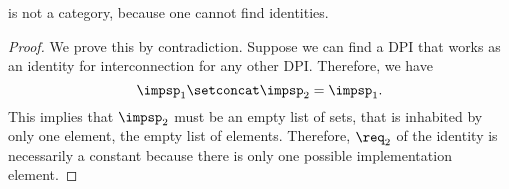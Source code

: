 \begin{lemma}
    \DPI is not a category, because one cannot find identities.
\end{lemma}
\begin{proof}
    We prove this by contradiction.
    Suppose we can find a DPI that works as an identity for interconnection for any other DPI.
    Therefore, we have
    \begin{equation}
        \impsp_{1} \setconcat \impsp_{2} = \impsp_{1}.
    \end{equation}
    This implies that $\impsp_{2}$ must be an empty list of sets,  that is inhabited by only one element, the empty list of elements.
    Therefore, $\req_2$ of the identity is necessarily a constant because there is only one possible implementation element.
\end{proof}





